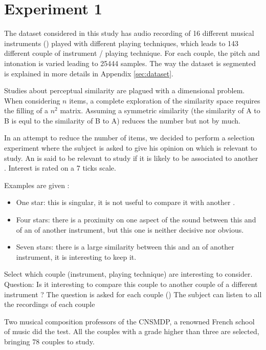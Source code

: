 \documentclass{article}
\begin{document}
\section{Experiment 1}\label{sec:}


The dataset considered in this study has audio recording of 16 different  musical instruments () played with different playing techniques, which leads to 143 different couple of instrument / playing technique. For each couple, the pitch and intonation is varied leading to 25444 samples. The way the dataset is segmented is explained in more details in Appendix \ref{sec:dataset}.

Studies about perceptual similarity are plagued with a dimensional problem. When considering $n$ items, a complete exploration of the similarity space requires the filling of a $n^2$ matrix. Assuming a symmetric similarity (the similarity of A to B is equl to the similarity of B to A) reduces the number but not by much.

In an attempt to reduce the number of items, we decided to perform a selection experiment where the subject is asked to give his opinion on which \ipt is relevant to study. An \ipt is said to be relevant to study if it is likely to be associated to another \ipt. Interest is rated on a 7 ticks scale.

Examples are given :
\begin{itemize}
  \item One star: this \ipt is singular, it is not useful to compare it with another \ipt.
  \item Four stars: there is a proximity on one aspect of the sound between this \ipt and of an \ipt of another instrument, but this one is neither decisive nor obvious.
  \item Seven stars: there is a large similarity between this \ipt and an \ipn of another instrument, it is interesting to keep it.
\end{itemize}


Select which couple (instrument, playing technique) are interesting to consider.
Question: Is it interesting to compare this couple to another couple of a different instrument ?
The question is asked for each couple ()
The subject can listen to all the recordings of each couple


Two musical composition professors of the CNSMDP, a renowned French school of music did the test. All the couples with a grade higher than three are selected, bringing 78 couples to study.
\end{document}
